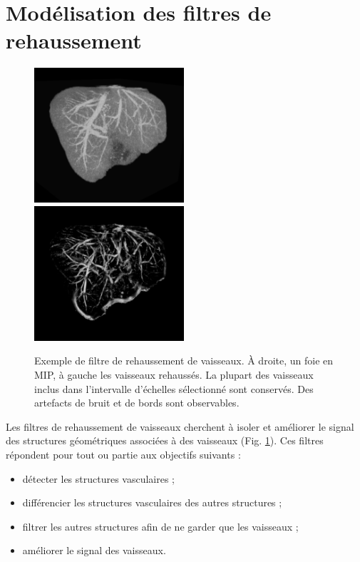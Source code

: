   \section{Modélisation des filtres de rehaussement}

  \begin{figure}[h]
    \centering
    \includegraphics[height=5cm]{Images/enhancement_part1.png}
    \includegraphics[height=5cm]{Images/enhancement_part2.png}
    \caption{Exemple de filtre de rehaussement de vaisseaux. À droite, un foie en MIP, à gauche les vaisseaux rehaussés. La plupart des vaisseaux inclus dans l'intervalle d'échelles sélectionné sont conservés. Des artefacts de bruit et de bords sont observables.}
    \label{fig:exemple_vesselness}
  \end{figure}

  Les filtres de rehaussement de vaisseaux cherchent à isoler et améliorer le signal des structures géométriques associées à des vaisseaux (Fig. \ref{fig:exemple_vesselness}). Ces filtres répondent pour tout ou partie aux objectifs suivants :

  \begin{itemize}
  \item détecter les structures vasculaires ;
  \item différencier les structures vasculaires des autres structures ;
  \item filtrer les autres structures afin de ne garder que les vaisseaux ;
  \item améliorer le signal des vaisseaux.
  \end{itemize}


